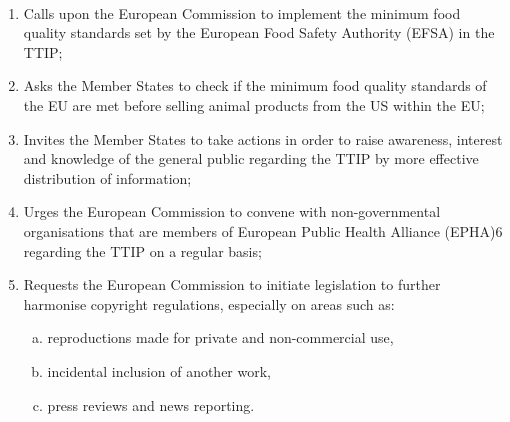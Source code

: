 \documentclass{resolution}
\begin{document}
~\\

\begin{enumerate}[1.]
	\item Calls upon the European Commission to implement the minimum food quality standards set by the European Food Safety Authority (EFSA) in the TTIP;
	\item Asks the Member States to check if the minimum food quality standards of the EU are met before selling animal products from the US within the EU;
	\item Invites the Member States to take actions in order to raise awareness, interest and knowledge of the general public regarding the TTIP by more effective distribution of information;
	\item Urges the European Commission to convene with non-governmental organisations that are members of European Public Health Alliance (EPHA)6 regarding the TTIP on a regular basis;
	\item Requests the European Commission to initiate legislation to further harmonise copyright regulations, especially on areas such as:
	\begin{enumerate}[a.]
		\item reproductions made for private and non-commercial use,
		\item incidental inclusion of another work,
		\item press reviews and news reporting.
	\end{enumerate}
\end{enumerate}
\end{document}
